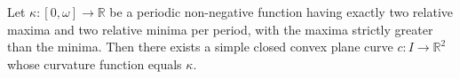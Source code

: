 Let $\kappa: [0, \omega] \to \mathbb{R}$ be a periodic non-negative function having exactly two relative maxima and two relative minima per period, with the maxima strictly greater than the minima. Then there exists a simple closed convex plane curve $c: I \to \mathbb{R}^2$ whose curvature function equals $\kappa$.